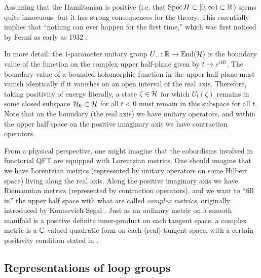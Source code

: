 Assuming that the Hamiltonian is positive
(i.e. that $\operatorname{Spec} H \subset [0,\infty ) \subset \mathbb{R}$)
seems quite innocuous, but it has strong consequences for the theory.
This essentially implies that ``nothing can ever happen for the first time,''
which was first noticed by Fermi as early as 1932 \cite{F}.

In more detail:
the $1$-parameter unitary group $U_{-} \colon \mathbb{R} \to \operatorname{End}(\mathcal{H})$ is the boundary value of the
function on the complex upper half-plane given by $t \mapsto e^{i H t}$.
The boundary value of a bounded holomorphic function in the upper half-plane must vanish
identically if it vanishes on an open interval of the real axis.
Therefore, taking positivity of energy literally, 
a state $\zeta \in \mathcal{H}$ for which $U_t\left(\zeta\right)$ remains in some closed subspace
$\mathcal{H}_0 \subset \mathcal{H}$ for all $t < 0$ must remain in this subspace for all $t$.
Note that on the boundary (the real axis) we have unitary operators, 
and within the upper half space on the positive imaginary axis we have 
contraction operators.

From a physical perspective, one might imagine that the cobordisms involved in functorial
QFT are equipped with Lorentzian metrics. 
One should imagine that we have Lorentzian metrics 
(represented by unitary operators on some Hilbert space)
living along the real axis. Along the positive imaginary axis we have Riemannian metrics
(represented by contraction operators), and we want to ``fill in'' the upper half space
with what are called \emph{complex metrics}, originally introduced by Kontsevich-Segal
\cite{KS}. Just as an ordinary metric on a smooth manifold is a positive definite 
inner-product on each tangent space, a complex metric is a $\mathbb{C}$-valued quadratic form on
each (real) tangent space, with a certain positivity condition stated in 
.

\subsection{Representations of loop groups}
\label{sec:loop_groups}

